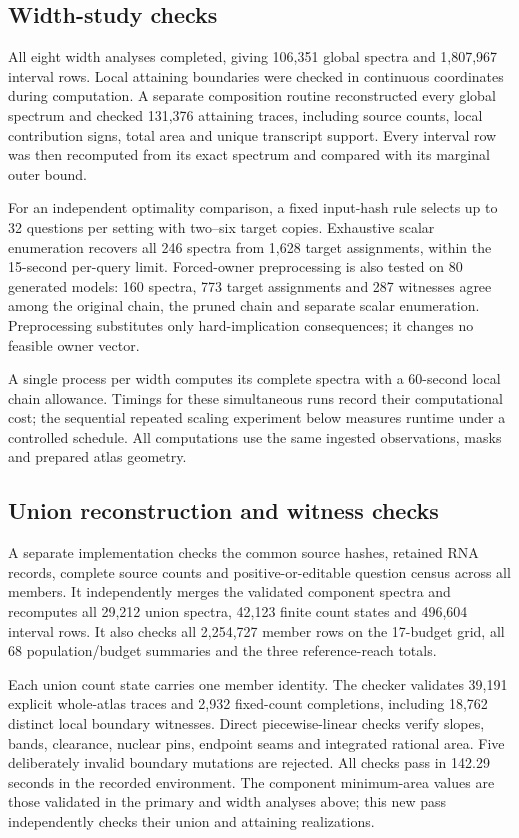 \documentclass[10pt,letterpaper]{article}
\begin{document}
\FloatBarrier
\subsection{Width-study checks}
All eight width analyses completed, giving 106,351 global spectra and 1,807,967 interval rows. Local attaining boundaries were checked in continuous coordinates during computation. A separate composition routine reconstructed every global spectrum and checked 131,376 attaining traces, including source counts, local contribution signs, total area and unique transcript support. Every interval row was then recomputed from its exact spectrum and compared with its marginal outer bound.

For an independent optimality comparison, a fixed input-hash rule selects up to 32 questions per setting with two--six target copies. Exhaustive scalar enumeration recovers all 246 spectra from 1,628 target assignments, within the 15-second per-query limit. Forced-owner preprocessing is also tested on 80 generated models: 160 spectra, 773 target assignments and 287 witnesses agree among the original chain, the pruned chain and separate scalar enumeration. Preprocessing substitutes only hard-implication consequences; it changes no feasible owner vector.

A single process per width computes its complete spectra with a 60-second local chain allowance. Timings for these simultaneous runs record their computational cost; the sequential repeated scaling experiment below measures runtime under a controlled schedule. All computations use the same ingested observations, masks and prepared atlas geometry.

\FloatBarrier
\subsection{Union reconstruction and witness checks}
A separate implementation checks the common source hashes, retained RNA records, complete source counts and positive-or-editable question census across all members. It independently merges the validated component spectra and recomputes all 29,212 union spectra, 42,123 finite count states and 496,604 interval rows. It also checks all 2,254,727 member rows on the 17-budget grid, all 68 population/budget summaries and the three reference-reach totals.

Each union count state carries one member identity. The checker validates 39,191 explicit whole-atlas traces and 2,932 fixed-count completions, including 18,762 distinct local boundary witnesses. Direct piecewise-linear checks verify slopes, bands, clearance, nuclear pins, endpoint seams and integrated rational area. Five deliberately invalid boundary mutations are rejected. All checks pass in 142.29 seconds in the recorded environment. The component minimum-area values are those validated in the primary and width analyses above; this new pass independently checks their union and attaining realizations.
\end{document}
